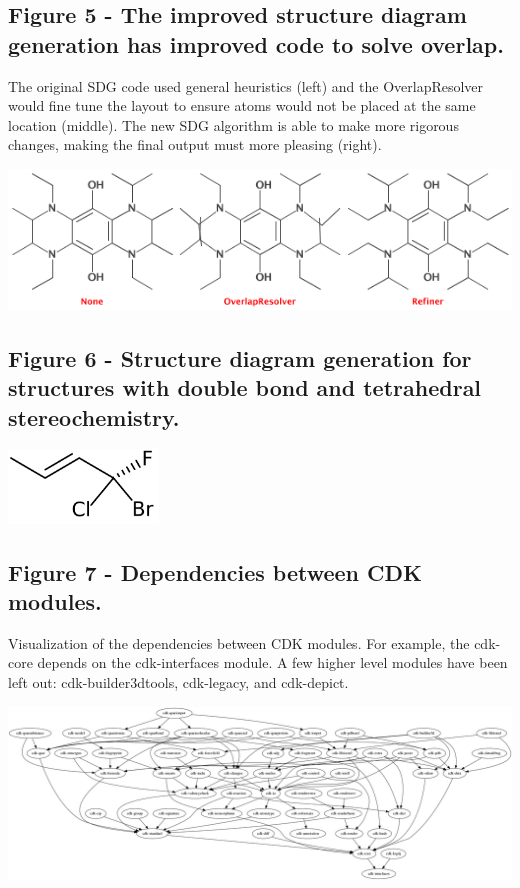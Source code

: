 \documentclass[10pt]{bmcart}
\begin{document}
\begin{backmatter}
\subsection*{Figure 5 - The improved structure diagram generation has improved
code to solve overlap.}\label{fig:sdg}
The original SDG code used general heuristics (left) and the
OverlapResolver would fine tune the layout to ensure atoms would not be placed
at the same location (middle). The new SDG algorithm is able to
make more rigorous changes, making the final output must more pleasing
(right).

\includegraphics[width=\textwidth]{sdg.png}

\subsection*{Figure 6 - Structure diagram generation for structures with
double bond and tetrahedral stereochemistry.}\label{fig:sdgstereo}

\includegraphics[width=0.3\textwidth]{sdg2.png}

  \subsection*{Figure 7 - Dependencies between CDK modules.}\label{fig:deps}
      Visualization of the dependencies between CDK modules. For example,
      the cdk-core depends on the cdk-interfaces module. A few higher level
      modules have been left out: cdk-builder3dtools, cdk-legacy, and
      cdk-depict.

\includegraphics[width=\textwidth]{cdkDeps.png}


\end{backmatter}
\end{document}
